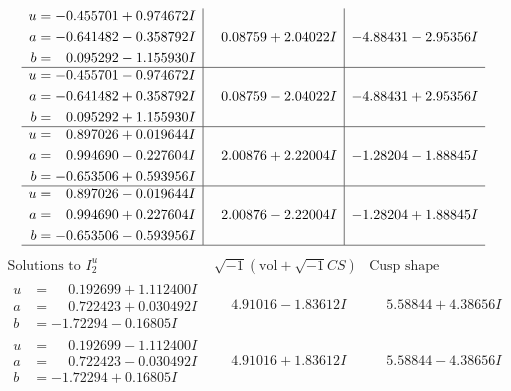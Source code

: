 \documentclass[1p]{elsarticle_modified}
\theoremstyle{definition}
\newcommand{\I}{\sqrt{-1}}
\begin{document}
$$\begin{array}{c|c|c}
\begin{aligned}
u &= -0.455701 + 0.974672 I \\
a &= -0.641482 - 0.358792 I \\
b &= \phantom{-}0.095292 - 1.155930 I\end{aligned}
 & \phantom{-}0.08759 + 2.04022 I & -4.88431 - 2.95356 I \\ \hline\begin{aligned}
u &= -0.455701 - 0.974672 I \\
a &= -0.641482 + 0.358792 I \\
b &= \phantom{-}0.095292 + 1.155930 I\end{aligned}
 & \phantom{-}0.08759 - 2.04022 I & -4.88431 + 2.95356 I \\ \hline\begin{aligned}
u &= \phantom{-}0.897026 + 0.019644 I \\
a &= \phantom{-}0.994690 - 0.227604 I \\
b &= -0.653506 + 0.593956 I\end{aligned}
 & \phantom{-}2.00876 + 2.22004 I & -1.28204 - 1.88845 I \\ \hline\begin{aligned}
u &= \phantom{-}0.897026 - 0.019644 I \\
a &= \phantom{-}0.994690 + 0.227604 I \\
b &= -0.653506 - 0.593956 I\end{aligned}
 & \phantom{-}2.00876 - 2.22004 I & -1.28204 + 1.88845 I\\
 \hline 
 \end{array}$$\newpage$$\begin{array}{c|c|c}  
\text{Solutions to }I^u_{2}& \I (\text{vol} + \sqrt{-1}CS) & \text{Cusp shape}\\
 \hline 
\begin{aligned}
u &= \phantom{-}0.192699 + 1.112400 I \\
a &= \phantom{-}0.722423 + 0.030492 I \\
b &= -1.72294 - 0.16805 I\end{aligned}
 & \phantom{-}4.91016 - 1.83612 I & \phantom{-}5.58844 + 4.38656 I \\ \hline\begin{aligned}
u &= \phantom{-}0.192699 - 1.112400 I \\
a &= \phantom{-}0.722423 - 0.030492 I \\
b &= -1.72294 + 0.16805 I\end{aligned}
 & \phantom{-}4.91016 + 1.83612 I & \phantom{-}5.58844 - 4.38656 I \\ \hline\begin{aligned}

\end{aligned}
\end{array}$$
\end{document}
